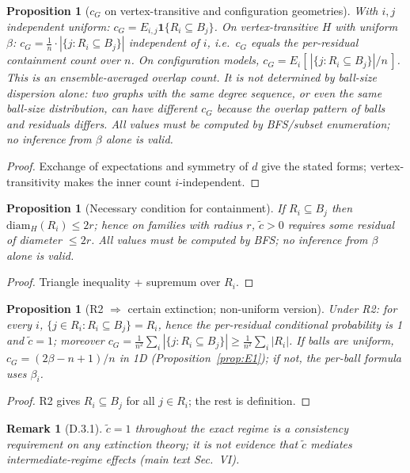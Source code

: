 \documentclass[preprint,12pt]{elsarticle}
\newtheorem{proposition}[theorem]{Proposition}
\newtheorem{remark}{Remark}[theorem]
\newcommand{\ctil}{\tilde{c}}
\newcommand{\cG}{c_G}
\begin{document}
\begin{proposition}[$\cG$ on vertex-transitive and configuration geometries]
\label{prop:D1}
With $i,j$ independent uniform: $\cG=E_{i,j}\mathbf1\{R_i\subseteq B_j\}$.
On vertex-transitive $H$ with uniform $\beta$:
$\cG=\frac{1}{n}\cdot|\{j:R_i\subseteq B_j\}|$ independent of $i$, i.e.\
$\cG$ equals the per-residual containment count over $n$. On
configuration models,
$\cG=E_i[\,|\{j:R_i\subseteq B_j\}|/n\,]$. This is an ensemble-averaged
overlap count. It is \emph{not} determined by ball-size dispersion alone:
two graphs with the same degree sequence, or even the same ball-size
distribution, can have different $\cG$ because the overlap pattern of
balls and residuals differs. All values must be computed by BFS/subset
enumeration; no inference from $\beta$ alone is valid.
\end{proposition}
\begin{proof}
Exchange of expectations and symmetry of $d$ give the stated forms;
vertex-transitivity makes the inner count $i$-independent.
\end{proof}

\begin{proposition}[Necessary condition for containment]
\label{prop:D2}
If $R_i\subseteq B_j$ then $\mathrm{diam}_H(R_i)\le2r$; hence on
families with radius $r$, $\ctil>0$ requires some residual of diameter
$\le2r$. All values must be computed by BFS; no inference from $\beta$
alone is valid.
\end{proposition}
\begin{proof}
Triangle inequality + supremum over $R_i$.
\end{proof}

\begin{proposition}[R2 $\Rightarrow$ certain extinction; non-uniform version]
\label{prop:D3}
Under R2: for every $i$, $\{j\in R_i:R_i\subseteq B_j\}=R_i$, hence
the per-residual conditional probability is 1 and $\ctil=1$; moreover
$\cG=\frac1{n^2}\sum_i|\{j:R_i\subseteq B_j\}|\ge\frac1{n^2}\sum_i|R_i|$.
If balls are uniform, $\cG=(2\beta-n+1)/n$ in 1D
(Proposition~\ref{prop:E1}); if not, the per-ball formula uses $\beta_i$.
\end{proposition}
\begin{proof}
R2 gives $R_i\subseteq B_j$ for all $j\in R_i$; the rest is definition.
\end{proof}
\begin{remark}[D.3.1]
\label{rem:D3.1}
$\ctil=1$ throughout the exact regime is a \emph{consistency
requirement} on any extinction theory; it is not evidence that $\ctil$
mediates intermediate-regime effects (main text Sec.~VI).
\end{remark}
\end{document}
